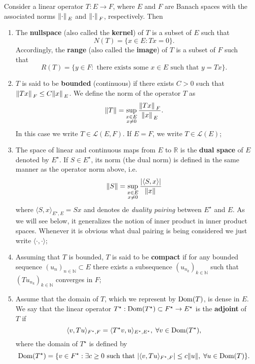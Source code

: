\begin{definition}\label{banach_op_def}
    Consider a linear operator \(T: E \rightarrow F\), where \(E\) and \(F\) are Banach spaces with the associated norms \(\norm*{\cdot}_E\) and \(\norm*{\cdot}_F\), respectively. Then
    \begin{enumerate}
        \item The \textbf{nullspace} (also called the \textbf{kernel}) of \(T\) is a subset of \(E\) such that
        \[
            N(T) = \{x \in E: Tx = 0\}.
        \]
        Accordingly, the \textbf{range} (also called the \textbf{image}) of \(T\) is a subset of \(F\) such that
        \[
            R(T) = \{y \in F: \text{ there exists some } x \in E \text{ such that } y = Tx\}.
        \]
        \item \(T\) is said to be \textbf{bounded} (continuous) if there exists \(C > 0\) such that \(\norm*{Tx}_F \leq C \norm*{x}_E\). We define the norm of the operator \(T\) as
        \[
            \norm{T} = \sup_{\substack{x \in E\\ x \neq 0}}\frac{\norm*{Tx}_F}{\norm*{x}_E}.
        \]
        In this case we write \(T \in \mathcal{L}(E, F)\). If \(E=F\), we write \(T \in \mathcal{L}(E)\);

        \item The space of linear and continuous maps from \(E\) to \(\mathbb{R}\) is the \textbf{dual space} of \(E\) denoted by \(E^\star\). If \(S \in E^\star\), its norm (the dual norm) is defined in the same manner as the operator norm above, i.e.
        \[
            \norm{S} = \sup_{\substack{x \in E\\ x \neq 0}}\frac{\abs{\langle S, x \rangle}}{\norm*{x}}
        \]
        where \(\langle S, x \rangle_{E^\star, E} = Sx\) and denotes de \textit{duality pairing} between \(E^\star\) and \(E\). As we will see below, it generalizes the notion of inner product in inner product spaces. Whenever it is obvious what dual pairing is being considered we just write \(\langle \cdot, \cdot \rangle\);        
        \item Assuming that \(T\) is bounded, \(T\) is said to be \textbf{compact} if for any bounded sequence \((u_n)_{n \in \mathbb{N}} \subset E\) there exists a subsequence \((u_{n_k})_{k \in \mathbb{N}}\) such that \((T u_{n_k})_{k \in \mathbb{N}}\) converges in \(F\);
        \item Assume that the domain of \(T\), which we represent by \(\operatorname{Dom}(T)\), is dense in \(E\). We say that the linear operator \(T^\star: \operatorname{Dom}(T^\star) \subset F^\star \rightarrow E^\star\) is the \textbf{adjoint} of \(T\) if 
        \[
            \langle v, T u \rangle_{F^\star, F} = \langle T^\star v, u \rangle_{E^\star, E^\star}, \; \forall v \in \operatorname{Dom}(T^\star),
        \]
        where the domain of \(T^\star\) is defined by
        \[
            \operatorname{Dom}(T^\star) = \{v \in F^\star: \exists c \geq 0 \text{ such that } \abs{\langle v, T u \rangle_{F^\star, F}} \leq c \norm{u}, \; \forall u \in \operatorname{Dom}(T)\}.
        \]
    \end{enumerate}
\end{definition}
